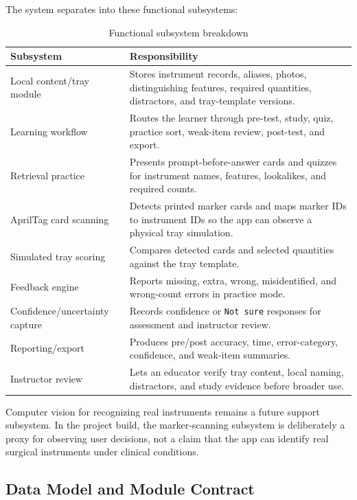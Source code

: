 \documentclass[10pt,a4paper]{article}
\begin{document}
The system separates into these functional subsystems:
\begin{table}[H]
\centering
\caption{Functional subsystem breakdown}
\label{tab:functional-subsystem-breakdown}
\small\renewcommand{\arraystretch}{1.2}\setlength{\tabcolsep}{4pt}
\begin{tabularx}{\textwidth}{|>{\raggedright\arraybackslash}X|>{\raggedright\arraybackslash}X|}
\hline
Subsystem & Responsibility \\
\hline
Local content/tray module & Stores instrument records, aliases, photos, distinguishing features, required quantities, distractors, and tray-template versions. \\
\hline
Learning workflow & Routes the learner through pre-test, study, quiz, practice sort, weak-item review, post-test, and export. \\
\hline
Retrieval practice & Presents prompt-before-answer cards and quizzes for instrument names, features, lookalikes, and required counts. \\
\hline
AprilTag card scanning & Detects printed marker cards and maps marker IDs to instrument IDs so the app can observe a physical tray simulation. \\
\hline
Simulated tray scoring & Compares detected cards and selected quantities against the tray template. \\
\hline
Feedback engine & Reports missing, extra, wrong, misidentified, and wrong-count errors in practice mode. \\
\hline
Confidence/uncertainty capture & Records confidence or \texttt{Not sure} responses for assessment and instructor review. \\
\hline
Reporting/export & Produces pre/post accuracy, time, error-category, confidence, and weak-item summaries. \\
\hline
Instructor review & Lets an educator verify tray content, local naming, distractors, and study evidence before broader use. \\
\hline
\end{tabularx}
\end{table}
Computer vision for recognizing real instruments remains a future support
subsystem. In the project build, the marker-scanning subsystem is deliberately a
proxy for observing user decisions, not a claim that the app can identify real
surgical instruments under clinical conditions.
\subsection{Data Model and Module Contract}
\end{document}
